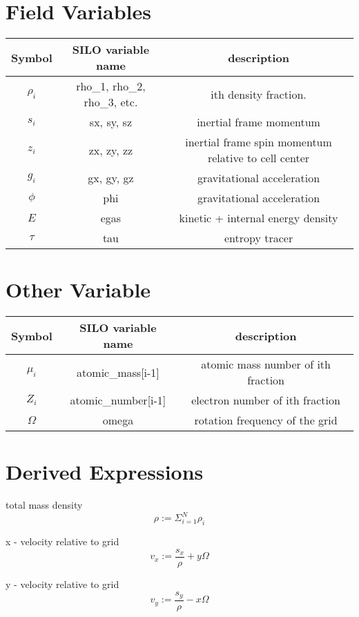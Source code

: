 \documentclass{article}
\begin{document}
\section{ Field Variables }
\begin{tabular}{|c|c|c|}
\hline
Symbol & SILO variable name & description \\
\hline
$\rho_i$ & rho\_1, rho\_2, rho\_3, etc. & ith density fraction. \\
$s_i$ & sx, sy, sz & inertial frame momentum \\
$z_i$ & zx, zy, zz & inertial frame spin momentum relative to cell center \\
$g_i$ & gx, gy, gz & gravitational acceleration \\
$\phi$ & phi & gravitational acceleration \\
$E$ & egas & kinetic + internal energy density \\
$\tau$ & tau & entropy tracer \\
\hline
\end{tabular}

\section{ Other Variable}

\begin{tabular}{|c|c|c|}
\hline
Symbol & SILO variable name & description \\
\hline
$\mu_i$ & atomic\_mass[i-1]  & atomic mass number of ith fraction \\ 
$Z_i$ & atomic\_number[i-1]  & electron number of ith fraction \\ 
$\Omega$ & omega & rotation frequency of the grid \\
\hline
\end{tabular}


\section{Derived Expressions}

total mass density
\begin{equation}
\rho := \Sigma_{i=1}^N \rho_i 
\end{equation}

x - velocity relative to grid
\begin{equation}
v_x  := \frac{s_x}{\rho} + y \Omega 
\end{equation}

y - velocity relative to grid
\begin{equation}
v_y  := \frac{s_y}{\rho} - x \Omega 
\end{equation}
\end{document}
